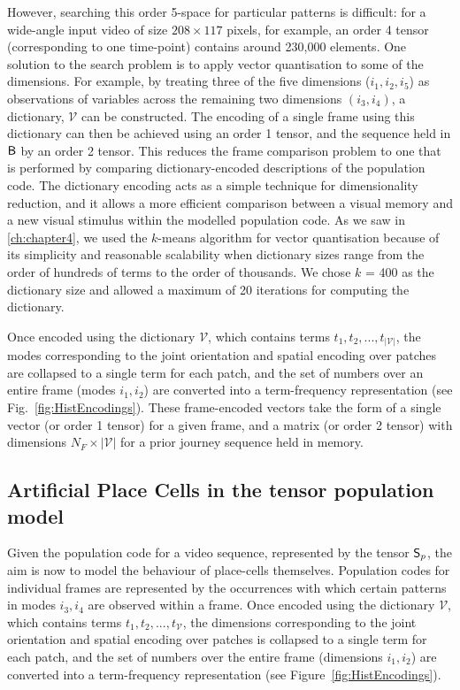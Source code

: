However, searching this order 5-space for particular patterns is difficult: for a wide-angle input video of size $208\times117$ pixels, for example, an order 4 tensor (corresponding to one time-point) contains around 230,000 elements. One solution to the search problem is to apply vector quantisation to some of the dimensions.  For example, by treating three of the five dimensions ($i_1,i_2,i_5$) as observations of variables across the remaining two dimensions $(i_3,i_4)$, a dictionary, $\mathcal{V}$ can be constructed. The encoding of a single frame using this dictionary can then be achieved using an order 1 tensor, and the sequence held in $\mathsf{B}$ by an order 2 tensor. This reduces the frame comparison problem to one that is performed by comparing dictionary-encoded descriptions of the population code. The dictionary encoding acts as a simple technique for dimensionality reduction, and it allows a more efficient comparison between a visual memory and a new visual stimulus within the modelled population code. As we saw in \ref{ch:chapter4}, we used the $k$-means algorithm for vector quantisation because of its simplicity and reasonable scalability when dictionary sizes range from the order of hundreds of terms to the order of thousands. We chose $k$ = 400 as the dictionary size and allowed a maximum of 20 iterations for computing the dictionary.

Once encoded using the dictionary $\mathcal{V}$, which contains terms $t_1,t_2,...,t_{|\mathcal{V}|}$, the modes corresponding to the joint orientation and spatial encoding over patches are collapsed to a single term for each patch, and the set of numbers over an entire frame (modes $i_1,i_2$) are converted into a term-frequency representation \cite{Wu:2008} (see Fig.~\ref{fig:HistEncodings}).  These frame-encoded vectors take the form of a single vector (or order 1 tensor) for a given frame, and a matrix (or order 2 tensor) with dimensions $N_F\times|\mathcal{V}|$ for a prior journey sequence held in memory. 

\subsection{Artificial Place Cells in the tensor population model}
\label{sec:APC}

Given the population code for a video sequence, represented by the tensor $\mathsf{S}_p$, the aim is now to model the behaviour of place-cells themselves.   Population codes for individual frames are represented by the occurrences with which certain patterns in modes $i_3,i_4$ are observed within a frame.   Once encoded using the dictionary $\mathcal{V}$, which contains terms $t_1,t_2,...,t_{\mathcal{V}}$, the dimensions corresponding to the joint orientation and spatial encoding over patches is collapsed to a single term for each patch, and the set of numbers over the entire frame (dimensions $i_1,i_2$) are converted into a term-frequency representation \cite{Wu:2008} (see Figure~\ref{fig:HistEncodings}).

